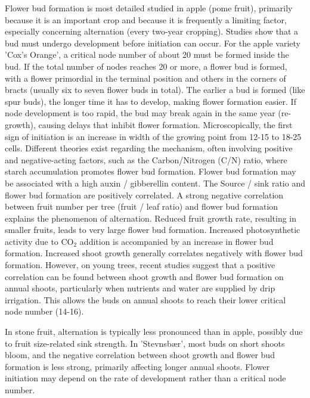 \vspace{0.5em}
Flower bud formation is most detailed studied in apple (pome fruit), primarily because it is an important crop and because it is frequently a limiting factor, especially concerning alternation (every two-year cropping). Studies show that a bud must undergo development before initiation can occur. For the apple variety 'Cox's Orange', a critical node number of about 20 must be formed inside the bud. If the total number of nodes reaches 20 or more, a flower bud is formed, with a flower primordial in the terminal position and others in the corners of bracts (usually six to seven flower buds in total). The earlier a bud is formed (like spur buds), the longer time it has to develop, making flower formation easier. If node development is too rapid, the bud may break again in the same year (re-growth), causing delays that inhibit flower formation. Microscopically, the first sign of initiation is an increase in width of the growing point from 12-15 to 18-25 cells. Different theories exist regarding the mechanism, often involving positive and negative-acting factors, such as the Carbon/Nitrogen (C/N) ratio, where starch accumulation promotes flower bud formation. Flower bud formation may be associated with a high auxin / gibberellin content. The Source / sink ratio and flower bud formation are positively correlated. A strong negative correlation between fruit number per tree (fruit / leaf ratio) and flower bud formation explains the phenomenon of alternation. Reduced fruit growth rate, resulting in smaller fruits, leads to very large flower bud formation. Increased photosynthetic activity due to CO$_2$ addition is accompanied by an increase in flower bud formation. Increased shoot growth generally correlates negatively with flower bud formation. However, on young trees, recent studies suggest that a positive correlation can be found between shoot growth and flower bud formation on annual shoots, particularly when nutrients and water are supplied by drip irrigation. This allows the buds on annual shoots to reach their lower critical node number (14-16).

\vspace{0.5em}
In stone fruit, alternation is typically less pronounced than in apple, possibly due to fruit size-related sink strength. In 'Stevnsbær', most buds on short shoots bloom, and the negative correlation between shoot growth and flower bud formation is less strong, primarily affecting longer annual shoots. Flower initiation may depend on the rate of development rather than a critical node number.

